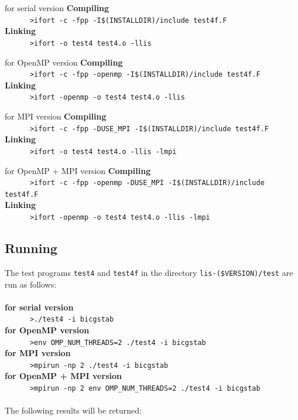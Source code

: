 \documentclass[a4paper]{article}
\begin{document}
\begin{itembox}[l]{for serial version}
\small
{\bf Compiling}\\
\verb+      >ifort -c -fpp -I$(INSTALLDIR)/include test4f.F+\\
{\bf Linking}\\
\verb+      >ifort -o test4 test4.o -llis+\\
\end{itembox}
\begin{itembox}[l]{for OpenMP version}
\small
{\bf Compiling}\\
\verb+      >ifort -c -fpp -openmp -I$(INSTALLDIR)/include test4f.F+\\
{\bf Linking}\\
\verb+      >ifort -openmp -o test4 test4.o -llis+\\
\end{itembox}
\begin{itembox}[l]{for MPI version}
\small
{\bf Compiling}\\
\verb+      >ifort -c -fpp -DUSE_MPI -I$(INSTALLDIR)/include test4f.F+\\
{\bf Linking}\\
\verb+      >ifort -o test4 test4.o -llis -lmpi+\\
\end{itembox}
\begin{itembox}[l]{for OpenMP + MPI version}
\small
{\bf Compiling}\\
\verb+      >ifort -c -fpp -openmp -DUSE_MPI -I$(INSTALLDIR)/include test4f.F+\\
{\bf Linking}\\
\verb+      >ifort -openmp -o test4 test4.o -llis -lmpi+\\
\end{itembox}

\subsection{Running}
The test programs \verb|test4| and \verb|test4f| 
in the directory \verb|lis-($VERSION)/test| are run as follows: \\\\
{\bf for serial version}\\
\verb+      >./test4 -i bicgstab+\\
{\bf for OpenMP version}\\
\verb+      >env OMP_NUM_THREADS=2 ./test4 -i bicgstab +\\
{\bf for MPI version}\\
\verb+      >mpirun -np 2 ./test4 -i bicgstab +\\
{\bf for OpenMP + MPI version}\\
\verb+      >mpirun -np 2 env OMP_NUM_THREADS=2 ./test4 -i bicgstab +\\\\
The following results will be returned:
\end{document}
